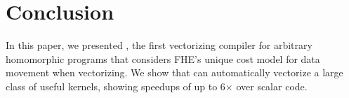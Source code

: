 \section{Conclusion}\label{sec:conclusion}
In this paper, we presented \system, the first vectorizing compiler for arbitrary homomorphic programs that considers FHE's unique cost model for data movement when vectorizing.
We show that \system can automatically vectorize a large class of useful kernels, showing speedups of up to 6$\times$ over scalar code.